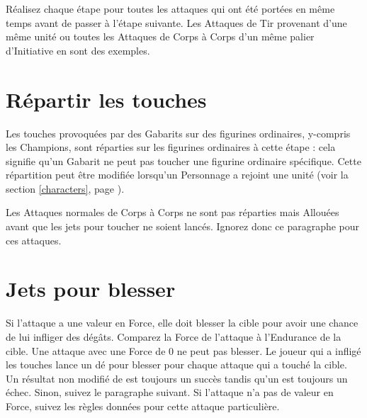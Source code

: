 Réalisez chaque étape pour toutes les attaques qui ont été portées en même temps avant de passer à l'étape suivante. Les Attaques de Tir provenant d'une même unité ou toutes les Attaques de Corps à Corps d'un même palier d'Initiative en sont des exemples.

\newpage
\hypertarget{distributehits}{\section{Répartir les touches}}

 Les touches provoquées par des Gabarits sur des figurines ordinaires, y-compris les Champions, sont réparties sur les figurines ordinaires à cette étape : cela signifie qu'un Gabarit ne peut pas toucher une figurine ordinaire spécifique. Cette répartition peut être modifiée lorsqu'un Personnage a rejoint une unité (voir la section \ref{characters}, page \pageref{characters}).

Les Attaques normales de Corps à Corps ne sont pas réparties mais Allouées avant que les jets pour toucher ne soient lancés. Ignorez donc ce paragraphe pour ces attaques. 


\hypertarget{towoundrolls}{\section{Jets pour blesser}}

Si l'attaque a une valeur en Force, elle doit blesser la cible pour avoir une chance de lui infliger des dégâts. Comparez la Force de l'attaque à l'Endurance de la cible. Une attaque avec une Force de 0 ne peut pas blesser. Le joueur qui a infligé les touches lance un dé pour blesser pour chaque attaque qui a touché la cible. Un résultat non modifié de  est toujours un succès tandis qu'un  est toujours un échec. Sinon, suivez le paragraphe suivant. Si l'attaque n'a pas de valeur en Force, suivez les règles données pour cette attaque particulière. 

